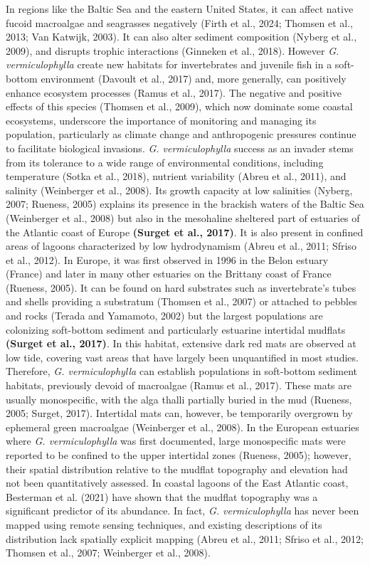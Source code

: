 \documentclass[
  letterpaper,
  DIV=11,
  numbers=noendperiod]{scrartcl}
\begin{document}
In regions like the Baltic Sea and the eastern United States, it can
affect native fucoid macroalgae and seagrasses negatively (Firth et al.,
2024; Thomsen et al., 2013; Van Katwijk, 2003). It can also alter
sediment composition (Nyberg et al., 2009), and disrupts trophic
interactions (Ginneken et al., 2018). However \emph{G. vermiculophylla}
create new habitats for invertebrates and juvenile fish in a soft-bottom
environment (Davoult et al., 2017) and, more generally, can positively
enhance ecosystem processes (Ramus et al., 2017). The negative and
positive effects of this species (Thomsen et al., 2009), which now
dominate some coastal ecosystems, underscore the importance of
monitoring and managing its population, particularly as climate change
and anthropogenic pressures continue to facilitate biological invasions.
\emph{G. vermiculophylla} success as an invader stems from its tolerance
to a wide range of environmental conditions, including temperature
(Sotka et al., 2018), nutrient variability (Abreu et al., 2011), and
salinity (Weinberger et al., 2008). Its growth capacity at low
salinities (Nyberg, 2007; Rueness, 2005) explains its presence in the
brackish waters of the Baltic Sea (Weinberger et al., 2008) but also in
the mesohaline sheltered part of estuaries of the Atlantic coast of
Europe \textbf{(Surget et al., 2017)}. It is also present in confined
areas of lagoons characterized by low hydrodynamism (Abreu et al., 2011;
Sfriso et al., 2012). In Europe, it was first observed in 1996 in the
Belon estuary (France) and later in many other estuaries on the Brittany
coast of France (Rueness, 2005). It can be found on hard substrates such
as invertebrate's tubes and shells providing a substratum (Thomsen et
al., 2007) or attached to pebbles and rocks (Terada and Yamamoto, 2002)
but the largest populations are colonizing soft-bottom sediment and
particularly estuarine intertidal mudflats \textbf{(Surget et al.,
2017)}. In this habitat, extensive dark red mats are observed at low
tide, covering vast areas that have largely been unquantified in most
studies. Therefore, \emph{G. vermiculophylla} can establish populations
in soft-bottom sediment habitats, previously devoid of macroalgae (Ramus
et al., 2017). These mats are usually monospecific, with the alga thalli
partially buried in the mud (Rueness, 2005; Surget, 2017). Intertidal
mats can, however, be temporarily overgrown by ephemeral green
macroalgae (Weinberger et al., 2008). In the European estuaries where
\emph{G. vermiculophylla} was first documented, large monospecific mats
were reported to be confined to the upper intertidal zones (Rueness,
2005); however, their spatial distribution relative to the mudflat
topography and elevation had not been quantitatively assessed. In
coastal lagoons of the East Atlantic coast, Besterman et al. (2021) have
shown that the mudflat topography was a significant predictor of its
abundance. In fact, \emph{G. vermiculophylla} has never been mapped
using remote sensing techniques, and existing descriptions of its
distribution lack spatially explicit mapping (Abreu et al., 2011; Sfriso
et al., 2012; Thomsen et al., 2007; Weinberger et al., 2008).
\end{document}
